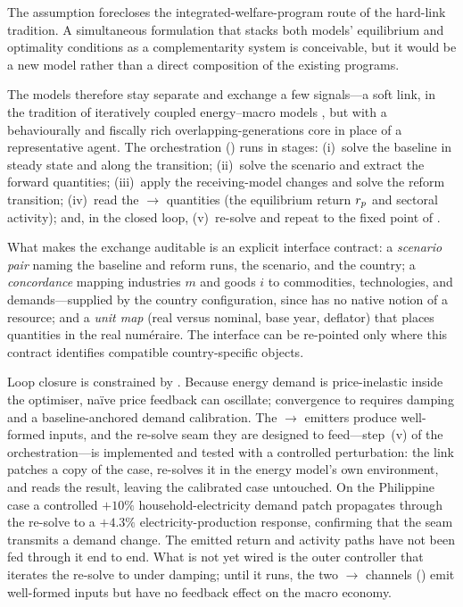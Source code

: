 \noindent The assumption forecloses the integrated-welfare-program route of the
hard-link tradition. A simultaneous formulation that stacks both models' equilibrium
and optimality conditions as a complementarity system is conceivable, but it would be a
new model rather than a direct composition of the existing programs.

\noindent The models therefore stay separate and exchange a few signals---a soft link,
in the tradition of iteratively coupled energy--macro models
\citep{messner_schrattenholzer_2000,manne_merge_1995,loulou_times_2008}, but with a
behaviourally and fiscally rich overlapping-generations core in place of a
representative agent. The orchestration () runs in stages:
(i)~solve the \OGCore{} baseline in steady state and along the transition;
(ii)~solve the \CLEWS{} scenario and extract the forward quantities; (iii)~apply the
receiving-model changes and solve the reform transition; (iv)~read the
\OGCore{}$\to$\CLEWS{} quantities (the equilibrium return $r_{p}$ and sectoral activity);
and, in the closed loop, (v)~re-solve \CLEWS{} and repeat to the fixed point of
.


What makes the exchange auditable is an explicit interface contract:
a \emph{scenario pair} naming the baseline and reform runs, the
\CLEWS{} scenario, and the country; a \emph{concordance} mapping \OGCore{} industries
$m$ and goods $i$ to \CLEWS{} commodities, technologies, and demands---supplied by the
country configuration, since \OGCore{} has no native notion of a resource; and a
\emph{unit map} (real versus nominal, base year, deflator) that places \CLEWS{} quantities
in the \OGCore{} real numéraire. The interface can be re-pointed only where this contract
identifies compatible country-specific objects.

Loop closure is constrained by . Because energy demand is
price-inelastic inside the optimiser, naïve price feedback can oscillate; convergence
to  requires damping and a baseline-anchored demand calibration.
The \OGCore{}$\to$\CLEWS{} emitters produce well-formed \CLEWS{} inputs, and the
\CLEWS{} re-solve seam they are designed to feed---step~(v) of the orchestration---is
implemented and tested with a controlled perturbation: the link
patches a copy of the \CLEWS{} case, re-solves it
in the energy model's own environment, and reads the result, leaving the calibrated case
untouched. On the Philippine case a controlled $+10\%$ household-electricity demand
patch propagates through the re-solve to a $+4.3\%$ electricity-production response,
confirming that the seam transmits a demand change. The emitted return and activity paths
have not been fed through it end to end. What is not yet wired is the
outer controller that iterates the re-solve to  under damping; until
it runs, the two \OGCore{}$\to$\CLEWS{} channels ()
emit well-formed inputs but have no feedback effect on the macro economy.

